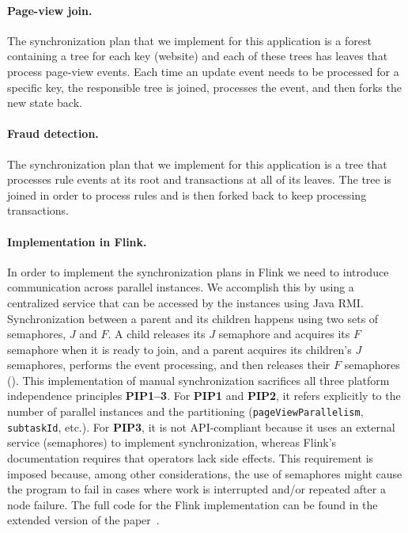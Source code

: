 \paragraph{Page-view join.}
The synchronization plan that we implement for this application is a forest containing a tree for each key (website) and each of these trees has leaves that process page-view events. Each time an update event needs to be processed for a specific key, the responsible tree is joined, processes the event, and then forks the new state back.

\paragraph{Fraud detection.}
The synchronization plan that we implement for this application is a tree that processes rule events at its root and transactions at all of its leaves. The tree is joined in order to process rules and is then forked back to keep processing transactions.

\paragraph{Implementation in Flink.}
In order to implement the synchronization plans in Flink we need to introduce communication across parallel instances. We accomplish this by using a centralized service that can be accessed by the instances using Java RMI. Synchronization between a parent and its children happens using two sets of semaphores, $J$ and $F$.
A child releases its $J$ semaphore and acquires its $F$ semaphore when it is ready to join, and a parent acquires its children's $J$ semaphores, performs the event processing, and then releases their $F$ semaphores ().
This implementation of manual synchronization
sacrifices all three platform independence principles \textbf{PIP1--3}.
For \textbf{PIP1} and \textbf{PIP2}, it refers explicitly to the number of parallel instances and the partitioning (\texttt{pageViewParallelism}, \texttt{subtaskId}, etc.).
For \textbf{PIP3}, it is not API-compliant because it uses an external service (semaphores) to implement synchronization, whereas Flink's documentation requires that operators lack side effects.
This requirement is imposed because, among other considerations, the use of semaphores might cause the program to fail in cases where
work is interrupted and/or repeated after a node failure.
The full code for the Flink implementation can be found in the extended version of the paper~\cite{flumina-arxiv}.

